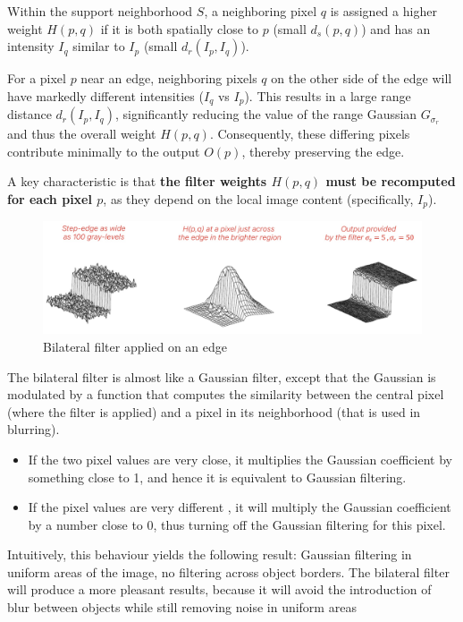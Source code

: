 Within the support neighborhood $S$, a neighboring pixel $q$ is assigned a higher weight $H(p,q)$ if it is both spatially close to $p$ (small $d_s(p,q)$) and has an intensity $I_q$ similar to $I_p$ (small $d_r(I_p,I_q)$).

For a pixel $p$ near an edge, neighboring pixels $q$ on the other side of the edge will have markedly different intensities ($I_q$ vs $I_p$). This results in a large range distance $d_r(I_p,I_q)$, significantly reducing the value of the range Gaussian $G_{\sigma_r}$ and thus the overall weight $H(p,q)$. Consequently, these differing pixels contribute minimally to the output $O(p)$, thereby preserving the edge.

A key characteristic is that \textbf{the filter weights $H(p,q)$ must be recomputed for each pixel $p$}, as they depend on the local image content (specifically, $I_p$).

\begin{figure}[htbp]
  \centering
  \includegraphics[width=0.9\linewidth]{./img/bilateral_filter.jpg}
  \caption{Bilateral filter applied on an edge}
  \label{fig:bilateral_filter}
\end{figure}

The bilateral filter is almost like a Gaussian filter, except that the Gaussian is modulated by a function that computes the similarity between the central pixel (where the filter is applied) and a pixel in its neighborhood (that is used in blurring).

\begin{itemize}
  \item If the two pixel values are very close, it multiplies the Gaussian coefficient by something close to 1, and hence it is equivalent to Gaussian filtering.
  \item If the pixel values are very different , it will multiply the Gaussian coefficient by a number close to 0, thus turning off the Gaussian filtering for this pixel.
\end{itemize}

Intuitively, this behaviour yields the following result: Gaussian filtering in uniform areas of the image, no filtering across object borders. The bilateral filter will produce a more pleasant results, because it will avoid the introduction of blur between objects while still removing noise in uniform areas


